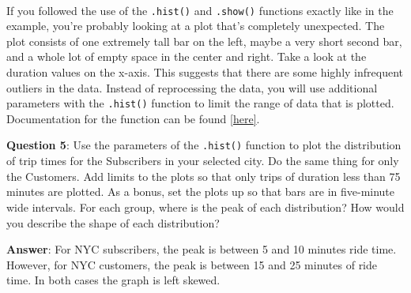\documentclass[11pt]{article}
\begin{document}
    \begin{center}
    \end{center}
    { \hspace*{\fill} \\}
    
    If you followed the use of the \texttt{.hist()} and \texttt{.show()}
functions exactly like in the example, you're probably looking at a plot
that's completely unexpected. The plot consists of one extremely tall
bar on the left, maybe a very short second bar, and a whole lot of empty
space in the center and right. Take a look at the duration values on the
x-axis. This suggests that there are some highly infrequent outliers in
the data. Instead of reprocessing the data, you will use additional
parameters with the \texttt{.hist()} function to limit the range of data
that is plotted. Documentation for the function can be found
\href{https://matplotlib.org/devdocs/api/_as_gen/matplotlib.pyplot.hist.html\#matplotlib.pyplot.hist}{{[}here{]}}.

\textbf{Question 5}: Use the parameters of the \texttt{.hist()} function
to plot the distribution of trip times for the Subscribers in your
selected city. Do the same thing for only the Customers. Add limits to
the plots so that only trips of duration less than 75 minutes are
plotted. As a bonus, set the plots up so that bars are in five-minute
wide intervals. For each group, where is the peak of each distribution?
How would you describe the shape of each distribution?

\textbf{Answer}: For NYC subscribers, the peak is between 5 and 10
minutes ride time. However, for NYC customers, the peak is between 15
and 25 minutes of ride time. In both cases the graph is left skewed.
\end{document}

